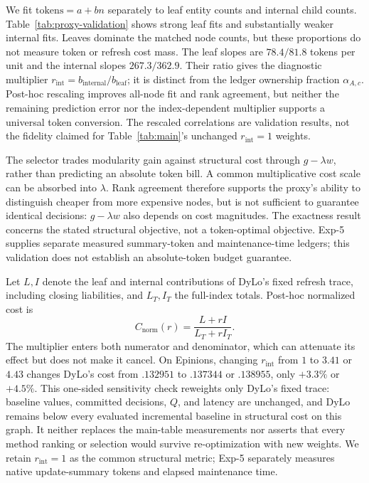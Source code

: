  We fit $\mathrm{tokens}=a+bn$ separately
to leaf entity counts and internal child counts. Table~\ref{tab:proxy-validation}
shows strong leaf fits and substantially weaker internal fits. Leaves dominate
the matched node counts, but these proportions do not measure token or refresh
cost mass. The leaf slopes are $78.4/81.8$ tokens per unit and the internal
slopes $267.3/362.9$. Their ratio gives the diagnostic multiplier
$r_{\mathrm{int}}=b_{\mathrm{internal}}/b_{\mathrm{leaf}}$; it is distinct from
the ledger ownership fraction $\alpha_{A,c}$. Post-hoc rescaling improves
all-node fit and rank agreement, but neither the remaining prediction error nor
the index-dependent multiplier supports a universal token conversion.
The rescaled correlations are validation results, not the fidelity claimed
for Table~\ref{tab:main}'s unchanged $r_{\mathrm{int}}=1$ weights.

 The selector trades modularity gain against
structural cost through $g-\lambda w$, rather than predicting an absolute token
bill. A common multiplicative cost scale can be absorbed into $\lambda$.
Rank agreement therefore supports the proxy's ability to distinguish cheaper
from more expensive nodes, but is not sufficient to guarantee identical
decisions: $g-\lambda w$ also depends on cost magnitudes. The exactness result
concerns the stated structural objective, not a token-optimal objective.
Exp-5 supplies separate measured summary-token and maintenance-time ledgers;
this validation does not establish an absolute-token budget guarantee.

 Let $L,I$ denote the leaf and
internal contributions of DyLo's fixed refresh trace, including closing
liabilities, and $L_T,I_T$ the full-index totals. Post-hoc normalized cost is
\[
  C_{\mathrm{norm}}(r)=\frac{L+rI}{L_T+rI_T}.
\]
The multiplier enters both numerator and denominator, which can attenuate its
effect but does not make it cancel. On Epinions, changing $r_{\mathrm{int}}$
from $1$ to $3.41$ or $4.43$ changes DyLo's cost from $.132951$ to
$.137344$ or $.138955$, only $+3.3\%$ or $+4.5\%$. This one-sided sensitivity
check reweights only DyLo's fixed trace: baseline values, committed decisions,
$Q$, and latency are unchanged, and DyLo remains below every evaluated
incremental baseline in structural cost on this graph. It neither replaces
the main-table measurements nor asserts that every method ranking or selection
would survive re-optimization with new weights. We retain $r_{\mathrm{int}}=1$
as the common structural metric; Exp-5 separately measures native update-summary tokens and elapsed maintenance time.

